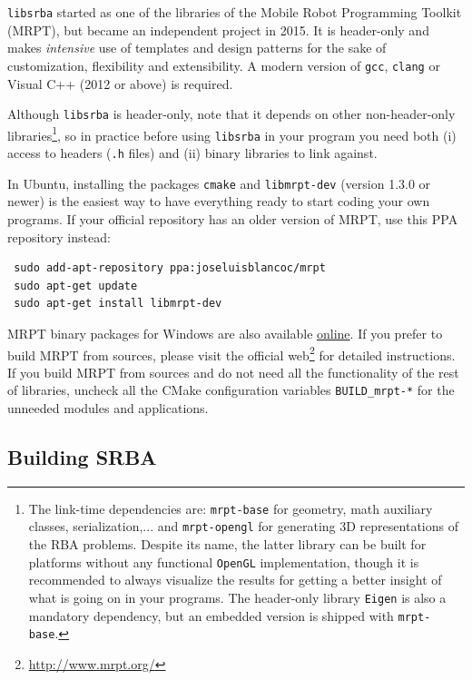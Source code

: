 \documentclass[a4paper,11pt]{article}
\begin{document}
\texttt{libsrba} started as one of the libraries of the Mobile Robot Programming Toolkit (MRPT), but became an independent project in 2015. 
It is header-only and makes \emph{intensive} use of templates and design patterns for the sake of customization, 
flexibility and extensibility. A modern version of \texttt{gcc}, \texttt{clang} or Visual C++ (2012 or above) is required.

Although \texttt{libsrba} is header-only, note that it depends on other non-header-only libraries\footnote{The link-time dependencies are: \texttt{mrpt-base} 
for geometry, math auxiliary classes, serialization,... and \texttt{mrpt-opengl} for generating 3D representations of 
the RBA problems. Despite its name, the latter library can be built for platforms without any 
functional \texttt{OpenGL} implementation, though it is recommended to always visualize the results for getting a better 
insight of what is going on in your programs. The header-only library \texttt{Eigen} \cite{eigenweb} is also a mandatory dependency, but 
an embedded version is shipped with \texttt{mrpt-base}.}, 
so in practice before using \texttt{libsrba} in your program you need
both (i) access to headers (\texttt{.h} files) and (ii) binary libraries to link against. 

In Ubuntu, installing the packages \texttt{cmake} and \texttt{libmrpt-dev} (version 1.3.0 or newer) is the easiest way to have 
everything ready to start coding your own programs.
If your official repository has an older version of MRPT, use this PPA repository instead:

\begin{lstlisting}
 sudo add-apt-repository ppa:joseluisblancoc/mrpt
 sudo apt-get update
 sudo apt-get install libmrpt-dev
\end{lstlisting}

MRPT binary packages for Windows are also available \href{http://www.mrpt.org/download}{online}.
If you prefer to build MRPT from sources, please visit the official web\footnote{\href{http://www.mrpt.org/}{http://www.mrpt.org/}} 
for detailed instructions. 
If you build MRPT from sources and do not need all the functionality of the rest of libraries, 
uncheck all the CMake configuration variables \texttt{BUILD\_mrpt-*} for the unneeded modules and applications. 

\subsection{Building SRBA}
\end{document}
